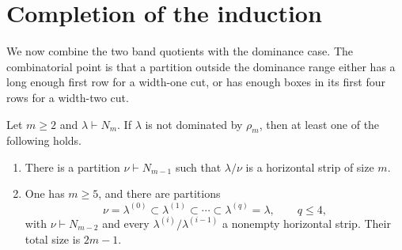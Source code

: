 \section{Completion of the induction}
\label{sec:completion}

We now combine the two band quotients with the dominance case. The
combinatorial point is that a partition outside the dominance range either
has a long enough first row for a width-one cut, or has enough boxes in its
first four rows for a width-two cut.

\begin{samepage}
\begin{lemma}
\label{comb:strip-reduction}
Let $m\ge2$ and $\lambda\vdash N_m$. If $\lambda$ is not dominated by
$\rho_m$, then at least one of the following holds.
\begin{enumerate}[label=\textup{(\roman*)}]
\item There is a partition $\nu\vdash N_{m-1}$ such that
      $\lambda/\nu$ is a horizontal strip of size $m$.
\item One has $m\ge5$, and there are partitions
      \[
      \nu=\lambda^{(0)}\subset\lambda^{(1)}\subset\cdots
      \subset\lambda^{(q)}=\lambda,
      \qquad q\le4,
      \]
      with $\nu\vdash N_{m-2}$ and every
      $\lambda^{(i)}/\lambda^{(i-1)}$ a nonempty horizontal strip.
      Their total size is $2m-1$.
\end{enumerate}
\end{lemma}
\end{samepage}

